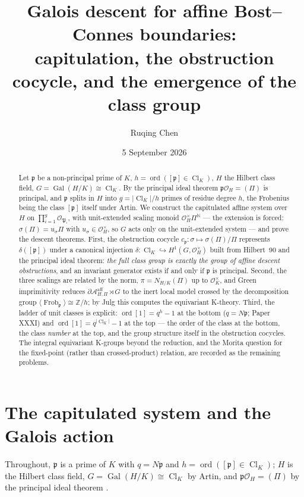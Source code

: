 \documentclass[11pt]{amsart}
\title[Galois descent for affine boundaries]{Galois descent for affine Bost--Connes boundaries:\\ capitulation, the obstruction cocycle, and the emergence of the class group}
\author{Ruqing Chen}
\date{5 September 2026}
\theoremstyle{remark}
\newcommand{\OK}{\mathcal{O}_K}
\newcommand{\OH}{\mathcal{O}_H}
\newcommand{\pp}{\mathfrak{p}}
\newcommand{\PP}{\mathfrak{P}}
\newcommand{\Z}{\mathbb{Z}}
\newcommand{\N}{\mathbb{N}}
\newcommand{\Ns}{N}
\newcommand{\Cl}{\operatorname{Cl}}
\newcommand{\Gal}{\operatorname{Gal}}
\newcommand{\Frob}{\operatorname{Frob}}
\newcommand{\ord}{\operatorname{ord}}
\newcommand{\Aaff}{\mathcal{A}^{\mathrm{aff}}}
\begin{document}
\begin{abstract}
Let $\pp$ be a non-principal prime of $K$, $h=\ord([\pp]\in\Cl_K)$, $H$ the Hilbert class
field, $G=\Gal(H/K)\cong\Cl_K$. By the principal ideal theorem $\pp\OH=(\Pi)$ is
principal, and $\pp$ splits in $H$ into $g=|\Cl_K|/h$ primes of residue degree $h$, the
Frobenius being the class $[\pp]$ itself under Artin. We construct the capitulated affine
system over $H$ on $\prod_{i=1}^g\mathcal O_{\PP_i}$, with unit-extended scaling monoid
$\OH^\times\Pi^{\N}$ --- the extension is forced: $\sigma(\Pi)=u_\sigma\Pi$ with
$u_\sigma\in\OH^\times$, so $G$ acts only on the unit-extended system --- and prove the
descent theorems. First, the obstruction cocycle $c_\pp:\sigma\mapsto\sigma(\Pi)/\Pi$
represents $\delta([\pp])$ under a canonical injection
$\delta:\Cl_K\hookrightarrow H^1(G,\OH^\times)$ built from Hilbert~90 and the principal
ideal theorem: \emph{the full class group is exactly the group of affine descent
obstructions}, and an invariant generator exists if and only if $\pp$ is principal.
Second, the three scalings are related by the norm, $\pi=N_{H/K}(\Pi)$ up to $\OK^\times$,
and Green imprimitivity reduces $\partial\Aaff_{H,\Pi}\rtimes G$ to the inert local model
crossed by the decomposition group $\langle\Frob_\pp\rangle\cong\Z/h$; by Julg this
computes the equivariant K-theory. Third, the ladder of unit classes is explicit:
$\ord[1]=q^{h}-1$ at the bottom ($q=\Ns\pp$; Paper XXXI) and
$\ord[1]=q^{|\Cl_K|}-1$ at the top --- the order of the class at the bottom, the class
\emph{number} at the top, and the group structure itself in the obstruction cocycles. The
integral equivariant K-groups beyond the reduction, and the Morita question for the
fixed-point (rather than crossed-product) relation, are recorded as the remaining
problems.
\end{abstract}

\maketitle

\section{The capitulated system and the Galois action}\label{sec:top}

Throughout, $\pp$ is a prime of $K$ with $q=\Ns\pp$ and $h=\ord([\pp]\in\Cl_K)$; $H$ is
the Hilbert class field, $G=\Gal(H/K)\cong\Cl_K$ by Artin, and $\pp\OH=(\Pi)$ by the
principal ideal theorem \cite[VI.7]{Neukirch}.
\end{document}
